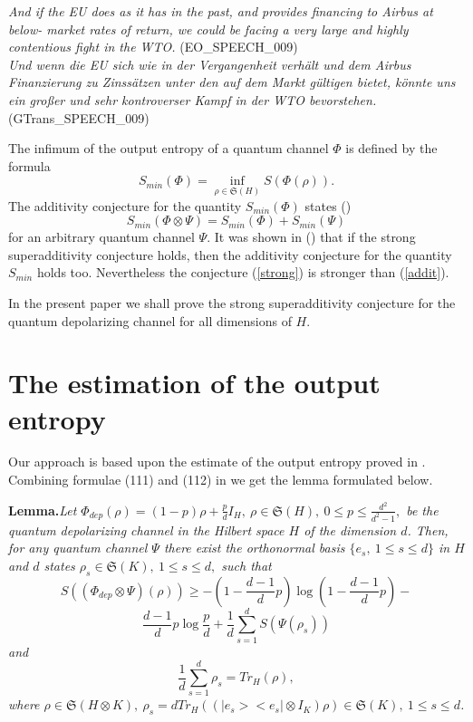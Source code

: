 \documentclass[twocolumn,showpacs,preprintnumbers,amsmath,amssymb]{revtex4}
\begin{document}
\ea \label{ex:culo:28}
   \ea \textit{And if the EU does as it has in the past, and provides financing to Airbus at below-  market rates of return, we could be facing a very large and highly contentious fight in the WTO.} (EO\_SPEECH\_009)\\
    \ex \textit{Und wenn die EU sich wie in der Vergangenheit verhält und dem Airbus Finanzierung zu Zinssätzen unter den auf dem Markt gültigen bietet, könnte uns ein großer und sehr kontroverser Kampf in der WTO bevorstehen.} (GTrans\_SPEECH\_009) 
    \z
\z







The infimum of the output entropy of a quantum channel $\Phi $ is
defined by the formula
\begin {equation}\label {addit}
S_{min}(\Phi)=\inf \limits _{\rho\in \mathfrak{S}(H)}S(\Phi
(\rho)).
\end {equation}
The additivity conjecture for the quantity $S_{min} (\Phi)$ states
(\cite {Hol2})
\begin {equation}\label {conj}
S_{min} (\Phi\otimes \Psi)=S_{min} (\Phi)+S_{min} (\Psi)
\end {equation}
for an arbitrary quantum channel $\Psi $. It was shown in (\cite
{Sh}) that if the strong superadditivity conjecture holds, then
the additivity conjecture for the quantity $S_{min}$ holds too.
Nevertheless the conjecture (\ref {strong}) is stronger than
(\ref {addit}).

In the present paper we shall prove the strong superadditivity
conjecture for the quantum depolarizing channel for all dimensions
of $H$.


\section {The estimation of the output entropy}


Our approach is based upon the estimate of the output entropy
proved in \cite {C02}. Combining formulae (111) and (112) in
\cite {C02} we get the lemma formulated below.

{\bf Lemma.}{\it Let $\Phi _{dep}(\rho)=(1-p)\rho+\frac
{p}{d}I_{H},\ \rho\in \mathfrak{S} (H),\ 0\le p\le \frac
{d^{2}}{d^{2}-1},$ be the quantum depolarizing channel in the
Hilbert space $H$ of the dimension $d$. Then, for any quantum
channel $\Psi $ there exist the orthonormal basis $\{e_{s},\ 1\le
s\le d\}$ in $H$ and $d$ states $\rho_{s}\in \mathfrak {S}(K),\
1\le s\le d,$ such that
\begin {equation}\label {XJ}
S((\Phi _{dep}\otimes \Psi)(\rho))\ge -(1-\frac {d-1}{d}p)\log
(1-\frac {d-1}{d}p)-
\end {equation}
$$
\frac {d-1}{d}p\log \frac {p}{d}+ \frac {1}{d}\sum \limits
_{s=1}^{d}S(\Psi (\rho_{s}))
$$
and
$$
\frac {1}{d}\sum \limits _{s=1}^{d}\rho _{s}=Tr_{H}(\rho ),
$$
where $\rho\in \mathfrak{S} (H\otimes K),\
\rho_{s}=dTr_{H}((|e_{s}><e_{s}|\otimes I_{K})\rho)\in \mathfrak
{S} (K),\ 1\le s\le d$. }
\end{document}
